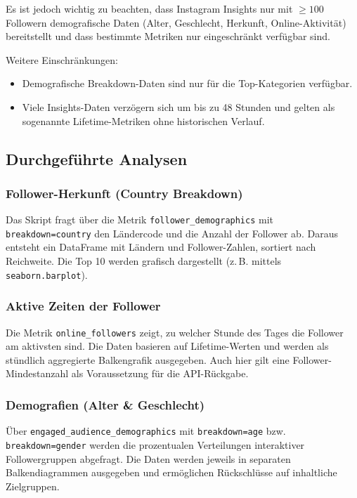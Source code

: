 \documentclass[a4paper,12pt]{article}
\begin{document}
Es ist jedoch wichtig zu beachten, dass Instagram Insights nur mit $ \geq 100 $ Followern demografische Daten (Alter, Geschlecht, Herkunft, Online-Aktivität) bereitstellt und dass bestimmte Metriken nur eingeschränkt verfügbar sind.

Weitere Einschränkungen:
\begin{itemize}
    \item Demografische Breakdown-Daten sind nur für die Top-Kategorien verfügbar.
    \item Viele Insights-Daten verzögern sich um bis zu 48 Stunden und gelten als sogenannte Lifetime-Metriken ohne historischen Verlauf.
\end{itemize}

\subsection{Durchgeführte Analysen}

\subsubsection*{Follower-Herkunft (Country Breakdown)}

Das Skript fragt über die Metrik \texttt{follower\_demographics} mit \texttt{breakdown=country} den Ländercode und die Anzahl der Follower ab. Daraus entsteht ein DataFrame mit Ländern und Follower-Zahlen, sortiert nach Reichweite. Die Top 10 werden grafisch dargestellt (z.\,B. mittels \texttt{seaborn.barplot}).

\subsubsection*{Aktive Zeiten der Follower}

Die Metrik \texttt{online\_followers} zeigt, zu welcher Stunde des Tages die Follower am aktivsten sind. Die Daten basieren auf Lifetime-Werten und werden als stündlich aggregierte Balkengrafik ausgegeben. Auch hier gilt eine Follower-Mindestanzahl als Voraussetzung für die API-Rückgabe.

\subsubsection*{Demografien (Alter \& Geschlecht)}

Über \texttt{engaged\_audience\_demographics} mit \texttt{breakdown=age} bzw. \texttt{breakdown=gender} werden die prozentualen Verteilungen interaktiver Followergruppen abgefragt. Die Daten werden jeweils in separaten Balkendiagrammen ausgegeben und ermöglichen Rückschlüsse auf inhaltliche Zielgruppen.
\end{document}
